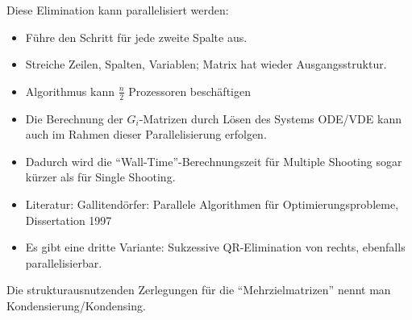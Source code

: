 Diese Elimination kann parallelisiert werden:

\begin{itemize}
\item Führe den Schritt für jede zweite Spalte aus.
\item Streiche Zeilen, Spalten, Variablen; Matrix hat wieder Ausgangsstruktur.
\item Algorithmus kann $\frac n2$ Prozessoren beschäftigen
\item Die Berechnung der $G_i$-Matrizen durch Lösen des Systems ODE/VDE kann auch im Rahmen dieser Parallelisierung erfolgen.
\item Dadurch wird die "`Wall-Time"'-Berechnungszeit für Multiple Shooting sogar kürzer als für Single Shooting.
\item Literatur: Gallitendörfer: Parallele Algorithmen für Optimierungsprobleme, Dissertation 1997
\item Es gibt eine dritte Variante: Sukzessive QR-Elimination von rechts, ebenfalls parallelisierbar.
\end{itemize}


Die strukturausnutzenden Zerlegungen für die "`Mehrzielmatrizen"' nennt man Kondensierung/Kondensing.









